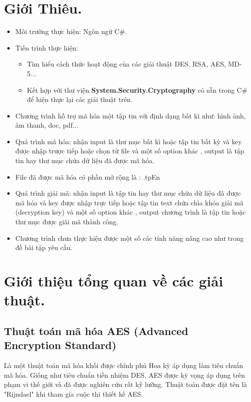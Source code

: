 \documentclass[paper=a4, fontsize=11pt]{scrartcl}	%
\numberwithin{equation}{section}															%
\numberwithin{figure}{section}																%
\numberwithin{table}{section}																%
\begin{document}
\section{Giới Thiêu.}
\begin{itemize}
\item Môi trường thực hiện: Ngôn ngữ C\#.
\item Tiến trình thực hiện: 
    \begin{itemize}
    \item Tìm hiểu cách thức hoạt động của các giải thuật DES, RSA, AES, MD-5...
    \item Kết hợp với thư viện  \textbf{System.Security.Cryptography} có sẵn trong C\# để hiện thực lại các giải thuật trên.
 
  \end{itemize}
\item Chương trình hỗ trợ mã hóa một tập tin với định dạng bất kì như: hình ảnh, âm thanh, doc, pdf...
\item Quá trình mã hóa: nhận input là thư mục bất kì hoặc tập tin bất kỳ  và key được nhập trược tiếp hoặc chọn từ file và một số option khác , output là tập tin hay thư mục chứa dữ liệu đã được mã hóa.
\item File đã được mã hóa có phần mở rộng là : .tpEn
\item Quá trình giải mã: nhận input là tập tin hay thư mục chứa dữ liệu đã được mã hóa và key được nhập trực tiếp hoặc tập tin text chứa chìa khóa giải mã (decryption key) và một số option khác , output chương trình là tập tin hoặc thư mục được giãi mã thành công.
\item Chương trình chưa thực hiện được một số các tính năng nâng cao như trong đề bài tập yêu cầu.

\end{itemize}
\section{Giới thiệu tổng quan về các giải thuật.}

	\subsection{Thuật toán mã hóa AES (Advanced Encryption Standard)}


   
   
   Là một thuật toán mã hóa khối được chính phủ Hoa kỳ áp dụng làm tiêu chuẩn mã hóa. Giống như tiêu chuẩn tiền nhiệm DES, AES được kỳ vọng áp dụng trên phạm vi thế giới và đã được nghiên cứu rất kỹ lưỡng. Thuật toán được đặt tên là "Rijndael" khi tham gia cuộc thi thiết kế AES.\\
    
\end{document}
